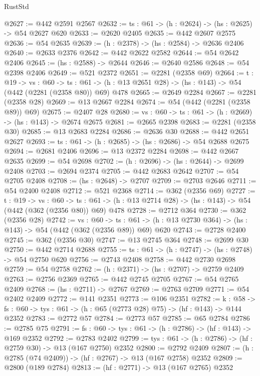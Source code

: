 \begin{lexlean}{RustStd}
\begin{coremodule}
@2627 := @442 @2591 @2567
@2632 := {ts : @61} -> (h : @2624) -> (hs : @2625) -> @54 @2627 @620
@2633 := @2620 @2405
@2635 := @442 @2607 @2575
@2636 := @54 @2635
@2639 := (h : @2378) -> (hs : @2584) -> @2636 @2406
@2640 := @2633 @2376
@2642 := @442 @2622 @2582
@2644 := @54 @2642 @2406
@2645 := (hs : @2588) -> @2644
@2646 := @2640 @2586
@2648 := @54 @2398 @2406
@2649 := @521 @2372
@2651 := @2281 (@2358 @69)
@2664 := {t : @19} ->
  {vs : @60} ->
  {ts : @61} -> (h : @13 @2651 @28) -> (hs : @143) -> @54 (@442 (@2281 (@2358 @80)) @69) @478
@2665 := @2649 @2284
@2667 := @2281 (@2358 @28)
@2669 := @13 @2667 @2284
@2674 := @54 (@442 (@2281 (@2358 @89)) @69)
@2675 := @2407 @28
@2680 := {vs : @60} -> {ts : @61} -> (h : @2669) -> (hs : @143) -> @2674 @2675
@2681 := @2665 @2398
@2683 := @2281 (@2358 @30)
@2685 := @13 @2683 @2284
@2686 := @2636 @30
@2688 := @442 @2651 @2627
@2693 := {ts : @61} -> (h : @2685) -> (hs : @2686) -> @54 @2688 @2675
@2694 := @2681 @2406
@2696 := @13 @2372 @2284
@2698 := @442 @2667 @2635
@2699 := @54 @2698
@2702 := (h : @2696) -> (hs : @2644) -> @2699 @2408
@2703 := @2694 @2374
@2705 := @442 @2683 @2642
@2707 := @54 @2705 @2408
@2708 := (hs : @2648) -> @2707
@2709 := @2703 @2646
@2711 := @54 @2400 @2408
@2712 := @521 @2368
@2714 := @362 (@2356 @69)
@2727 := {t : @19} ->
  {vs : @60} ->
  {ts : @61} -> (h : @13 @2714 @28) -> (hs : @143) -> @54 (@442 (@362 (@2356 @80)) @69) @478
@2728 := @2712 @364
@2730 := @362 (@2356 @28)
@2742 := {vs : @60} ->
  {ts : @61} -> (h : @13 @2730 @364) -> (hs : @143) -> @54 (@442 (@362 (@2356 @89)) @69) @620
@2743 := @2728 @2400
@2745 := @362 (@2356 @30)
@2747 := @13 @2745 @364
@2748 := @2699 @30
@2750 := @442 @2714 @2688
@2755 := {ts : @61} -> (h : @2747) -> (hs : @2748) -> @54 @2750 @620
@2756 := @2743 @2408
@2758 := @442 @2730 @2698
@2759 := @54 @2758
@2762 := (h : @2371) -> (hs : @2707) -> @2759 @2409
@2763 := @2756 @2369
@2765 := @442 @2745 @2705
@2767 := @54 @2765 @2409
@2768 := (hs : @2711) -> @2767
@2769 := @2763 @2709
@2771 := @54 @2402 @2409
@2772 := @141 @2351
@2773 := @106 @2351
@2782 := {k : @58} ->
  {fs : @60} -> {tys : @61} -> (h : @65 (@2773 @28) @75) -> (hf : @143) -> @144 @2352
@2783 := @2772 @57
@2784 := @2773 @57
@2785 := @65 @2784
@2786 := @2785 @75
@2791 := {fs : @60} -> {tys : @61} -> (h : @2786) -> (hf : @143) -> @169 @2352
@2792 := @2783 @2402
@2799 := {tys : @61} -> (h : @2786) -> (hf : @2759 @30) -> @13 (@167 @2750) @2352
@2800 := @2792 @2409
@2807 := (h : @2785 (@74 @2409)) -> (hf : @2767) -> @13 (@167 @2758) @2352
@2809 := @2800 (@189 @2784)
@2813 := (hf : @2771) -> @13 (@167 @2765) @2352

\end{coremodule}
\end{lexlean}
